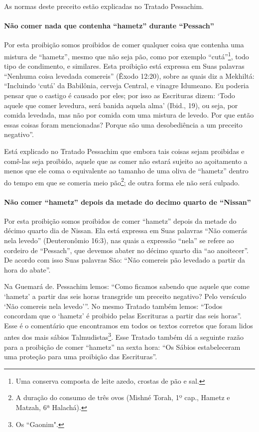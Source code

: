 As normas deste preceito estão explicadas no Tratado Pessachim.

\paragraph{Não comer nada que contenha ``hametz'' durante ``Pessach''}

Por esta proibição somos proibidos de comer qualquer coisa que contenha
uma mistura de ``hametz'', mesmo que não seja pão, como por exemplo
``cutá''\footnote{Uma conserva composta de leite azedo, crostas de pão e sal.}, todo tipo de condimento, e similares.
Esta proibição está expressa em Suas palavras ``Nenhuma coisa levedada
comereis'' (Êxodo 12:20), sobre as quais diz a Mekhiltá: ``Incluindo
`cutá' da Babilônia, cerveja Central, e vinagre Idumeano. Eu poderia
pensar que o castigo é causado por eles; por isso as Escrituras dizem:
`Todo aquele que comer levedura, será banida aquela alma' (Ibid., 19),
ou seja, por comida levedada, mas não por comida com uma mistura de
levedo. Por que então essas coisas foram mencionadas? Porque são uma
desobediência a um preceito negativo''.

Está explicado no Tratado Pessachim que embora tais coisas sejam
proibidas e comê-las seja proibido, aquele que as comer não estará
sujeito ao açoitamento a menos que ele coma o equivalente ao tamanho de
uma oliva de ``hametz'' dentro do tempo em que se comeria meio
pão\footnote{A duração do consumo de três ovos (Mishné Torah, 1º cap., Hametz e
  Matzah, 6ª Halachá).}; de outra forma ele não será culpado.

\paragraph{Não comer ``hametz'' depois da metade do decimo quarto de ``Nissan''}

Por esta proibição somos proibidos de comer ``hametz'' depois da metade
do décimo quarto dia de Nissan. Ela está expressa em Suas palavras ``Não
comerás nela levedo'' (Deuteronômio 16:3), nas quais a expressão
``nela'' se refere ao cordeiro de ``Pessach'', que devemos abater no
décimo quarto dia ``ao anoitecer''. De acordo com isso Suas palavras
São: ``Não comereis pão levedado a partir da hora do abate''.

Na Guemará de. Pessachim lemos: ``Como ficamos sabendo que aquele que
come `hametz' a partir das seis horas transgride um preceito negativo?
Pelo versículo `Não comereis nela levedo'''. No mesmo Tratado também
lemos: ``Todos concordam que o `hametz' é proibido pelas Escrituras a
partir das seis horas''. Esse é o comentário que encontramos em todos os
textos corretos que foram lidos antes dos mais sábios
Talmudistas\footnote{Os ``Gaonim".}. Esse Tratado também dá a seguinte
razão para a proibição de comer ``hametz'' na sexta hora: ``Os Sábios
estabeleceram uma proteção para uma proibição das Escrituras''.

